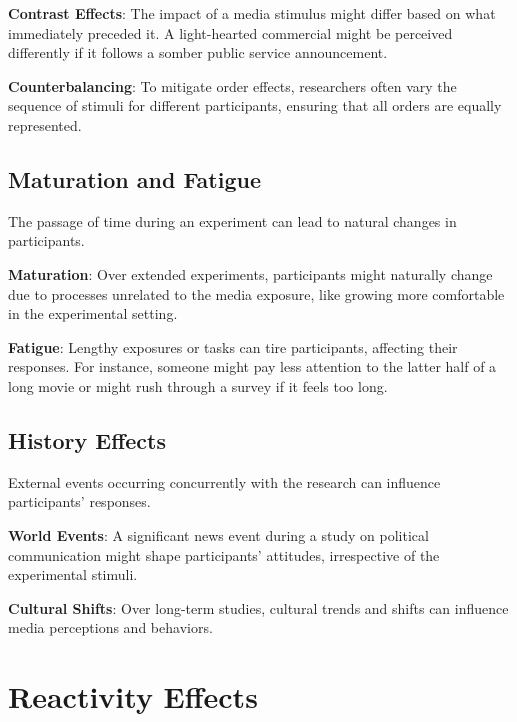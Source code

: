 \documentclass[
  b5paper]{book}
\begin{document}
\textbf{Contrast Effects}: The impact of a media stimulus might differ based on what immediately preceded it. A light-hearted commercial might be perceived differently if it follows a somber public service announcement.

\textbf{Counterbalancing}: To mitigate order effects, researchers often vary the sequence of stimuli for different participants, ensuring that all orders are equally represented.

\hypertarget{maturation-and-fatigue}{%
\subsection*{Maturation and Fatigue}\label{maturation-and-fatigue}}

The passage of time during an experiment can lead to natural changes in participants.

\textbf{Maturation}: Over extended experiments, participants might naturally change due to processes unrelated to the media exposure, like growing more comfortable in the experimental setting.

\textbf{Fatigue}: Lengthy exposures or tasks can tire participants, affecting their responses. For instance, someone might pay less attention to the latter half of a long movie or might rush through a survey if it feels too long.

\hypertarget{history-effects}{%
\subsection*{History Effects}\label{history-effects}}

External events occurring concurrently with the research can influence participants' responses.

\textbf{World Events}: A significant news event during a study on political communication might shape participants' attitudes, irrespective of the experimental stimuli.

\textbf{Cultural Shifts}: Over long-term studies, cultural trends and shifts can influence media perceptions and behaviors.

\hypertarget{reactivity-effects}{%
\section{Reactivity Effects}\label{reactivity-effects}}
\end{document}
